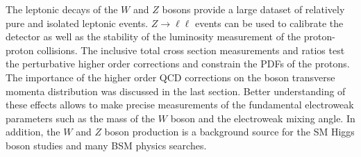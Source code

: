 The leptonic decays of the $W$ and $Z$ bosons provide a large dataset of relatively pure and isolated leptonic events. $Z \rightarrow \ell \ell$ events can be used to calibrate the detector as well as the stability of the luminosity measurement of the proton-proton collisions. The inclusive total cross section measurements and ratios test the perturbative higher order corrections and constrain the PDFs of the protons. The importance of the higher order QCD corrections on the boson transverse momenta distribution was discussed in the last section. Better understanding of these effects allows to make precise measurements of the fundamental electroweak parameters such as the mass of the $W$ boson and the electroweak mixing angle. In addition, the $W$ and $Z$ boson production is a background source for the SM Higgs boson studies and many BSM physics searches.


